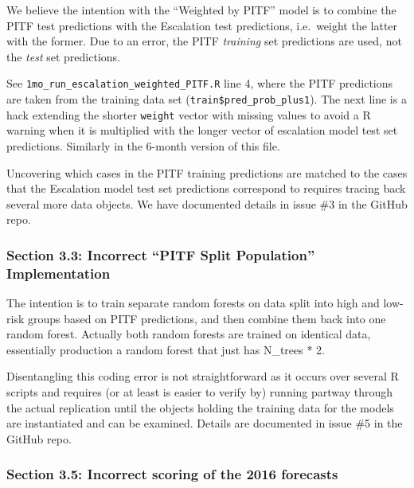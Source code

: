 \documentclass[
]{article}
\begin{document}
We believe the intention with the ``Weighted by PITF'' model is to combine the PITF test predictions with the Escalation test predictions, i.e.~weight the latter with the former. Due to an error, the PITF \emph{training} set predictions are used, not the \emph{test} set predictions.

See \texttt{1mo\_run\_escalation\_weighted\_PITF.R} line 4, where the PITF predictions are taken from the training data set (\texttt{train\$pred\_prob\_plus1}). The next line is a hack extending the shorter \texttt{weight} vector with missing values to avoid a R warning when it is multiplied with the longer vector of escalation model test set predictions. Similarly in the 6-month version of this file.

Uncovering which cases in the PITF training predictions are matched to the cases that the Escalation model test set predictions correspond to requires tracing back several more data objects. We have documented details in issue \#3 in the GitHub repo.

\hypertarget{section-3.3-incorrect-pitf-split-population-implementation}{%
\subsubsection{Section 3.3: Incorrect ``PITF Split Population'' Implementation}\label{section-3.3-incorrect-pitf-split-population-implementation}}

The intention is to train separate random forests on data split into high and low-risk groups based on PITF predictions, and then combine them back into one random forest. Actually both random forests are trained on identical data, essentially production a random forest that just has N\_trees * 2.

Disentangling this coding error is not straightforward as it occurs over several R scripts and requires (or at least is easier to verify by) running partway through the actual replication until the objects holding the training data for the models are instantiated and can be examined. Details are documented in issue \#5 in the GitHub repo.

\hypertarget{section-3.5-incorrect-scoring-of-the-2016-forecasts}{%
\subsubsection{Section 3.5: Incorrect scoring of the 2016 forecasts}\label{section-3.5-incorrect-scoring-of-the-2016-forecasts}}
\end{document}
